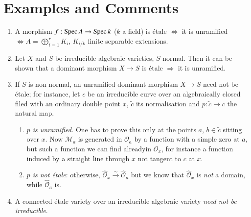 \section{Examples and Comments}\label{chap3-sec3.2}

\begin{enumerate}
\renewcommand{\labelenumi}{(\theenumi)}
\item A morphism $f:\operatorname{Spec} A\to \operatorname{Spec} k$ ($k$ a field) is \'etale
  $\Leftrightarrow$ it is unramified $\Leftrightarrow
  A=\bigoplus\limits^{r}_{i=1}K_{i}$, $K_{i/k}$ finite separable
  extensions.

\item Let $X$ and $S$ be irreducible algebraic varieties, $S$
  normal. Then it can be shown that a dominant morphism $X\to S$ is
  \'etale $\Longrightarrow$ it is unramified.

\item If $S$ is non-normal, an unramified dominant morphism $X\to S$
  need not be \'etale; for instance, let $c$ be an irreducible curve
  over an algebraically closed filed with an ordinary double point
  $x$, $\widetilde{c}$ its normalisation and $p:\widetilde{c}\to c$
  the natural map.
\begin{enumerate}
\renewcommand{\theenumii}{\roman{enumii}}
\renewcommand{\labelenumii}{(\theenumii)}
\item {\em $p$ is unramified.} One has to prove this only at the
  points $a$, $b\in \widetilde{c}$ sitting over $x$. Now
  $\mathscr{M}_{a}$ is generated in $\mathscr{O}_{a}$ by a function
  with a simple zero at $a$, but such a function we can find
  already\pageoriginale in $\mathscr{O}_{x}$, for instance a function
  induced by a straight line through $x$ not tangent to $c$ at $x$.

\item {\em $p$ is not \'etale}: otherwise,
  $\widehat{\mathscr{O}}_{x}\xrightarrow{\sim}\widehat{\mathscr{O}}_{a}$
  but we know that $\widehat{\mathscr{O}}_{x}$ is {\em not} a domain,
  while $\widehat{\mathscr{O}}_{a}$ is.
\end{enumerate}

\item A connected \'etale variety over an irreducible algebraic
  variety {\em need not be irreducible}.



\end{enumerate}
